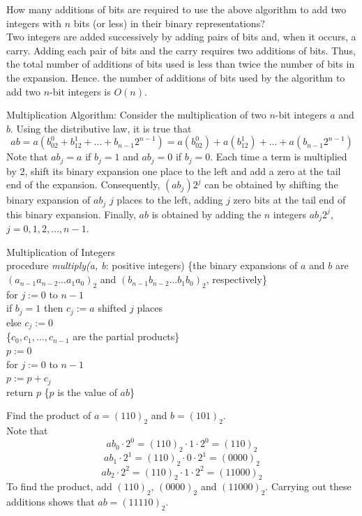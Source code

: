 \documentclass[12pt]{article}
\begin{document}
\begin{example} How many additions of bits are required to use the above algorithm to add two integers with $n$ bits (or less) in their binary representations? \\ Two integers are added successively by adding pairs of bits and, when it occurs, a carry. Adding each pair of bits and the carry requires two additions of bits. Thus, the total number of additions of bits used is less than twice the number of bits in the expansion. Hence. the number of additions of bits used by the algorithm to add two $n$-bit integers is $O(n)$. \end{example} 
\begin{alg} Multiplication Algorithm: Consider the multiplication of two $n$-bit integers $a$ and $b$. Using the distributive law, it is true that $$ab = a(b_02^0 + b_12^1 + \dots + b_{n - 1}2^{n - 1}) = a(b_02^0) + a(b_12^1) + \dots + a(b_{n - 1}2^{n - 1})$$ 
Note that $ab_j = a$ if $b_j = 1$ and $ab_j = 0$ if $b_j = 0$. Each time a term is multiplied by 2, shift its binary expansion one place to the left and add a zero at the tail end of the expansion. Consequently, $(ab_j)2^j$ can be obtained by shifting the binary expansion of $ab_j$ $j$ places to the left, adding $j$ zero bits at the tail end of this binary expansion. Finally, $ab$ is obtained by adding the $n$ integers $ab_j2^j$, $j = 0, 1, 2, \dots, n - 1$. \end{alg}
\begin{alg} Multiplication of Integers \\ procedure \textit{multiply(a, b}: positive integers) \{the binary expansions of $a$ and $b$ are $(a_{n - 1}a_{n - 2}\dots a_1a_0)_2$ and $(b_{n - 1}b_{n - 2}\dots b_1b_0)_2$, respectively\} \\ for $j := 0$ to $n - 1$ \\ \indent if $b_j = 1$ then $c_j := a$ shifted $j$ places \\ \indent else $c_j := 0$ \\ \{$c_0, c_1, \dots, c_{n - 1}$ are the partial products\} \\ $p := 0$ \\ for $j := 0$ to $n - 1$ \\ \indent $p := p + c_j$ \\ return $p$ \{$p$ is the value of $ab$\} \end{alg} 
\begin{example} Find the product of $a = (110)_2$ and $b = (101)_2$. \\ Note that $$ab_0 \cdot 2^0 = (110)_2 \cdot 1 \cdot 2^0 = (110)_2$$ $$ab_1 \cdot 2^1 = (110)_2 \cdot 0 \cdot 2^1 = (0000)_2$$ $$ab_2 \cdot 2^2 = (110)_2 \cdot 1 \cdot 2^2 = (11000)_2$$ To find the product, add $(110)_2$, $(0000)_2$ and $(11000)_2$. Carrying out these additions shows that $ab = (11110)_2$. \end{example} 
\end{document}
